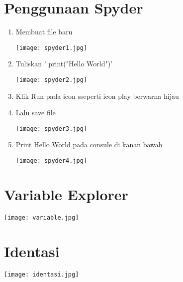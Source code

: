 \documentclass[a4paper,12pt]{report}
\begin{document}
\section{Penggunaan Spyder}
\begin{enumerate}
    \item Membuat file baru
    \begin{center}
        \texttt{[image: spyder1.jpg]}
    \end{center}
    \item Tuliskan ' print("Hello World")'
    \begin{center}
        \texttt{[image: spyder2.jpg]}
    \end{center}
    \item Klik Run pada icon sseperti icon play berwarna hijau
    \item Lalu save file
    \begin{center}
        \texttt{[image: spyder3.jpg]}
    \end{center}
    \item Print Hello World pada consule di kanan bawah
    \begin{center}
        \texttt{[image: spyder4.jpg]}
    \end{center}
\end{enumerate}
\section{Variable Explorer}
\usepackage{Variable Explore berada di bagian kanan atas berisikan Name, Type, Size. Variable sendiri dapat terisi secara otomatis selama kita menginputkan variable }
\begin{center}
    \texttt{[image: variable.jpg]}
\end{center}

\section{Identasi}
\usepackage{Identasi adalah suatu kesatuan Kode program yang berada pada sisi kiri maka dibaca sebagai satu blok, untuk membuat sub blok maka cukup dengan memberikan jarak spasi atau tab ke kanan. Biasanya dalam Python identasi terjadi saat pencabangan, perulangan, fungsi, class, dan if bersarang.}
\begin{center}
    \texttt{[image: identasi.jpg]}
\end{center}
\end{document}
